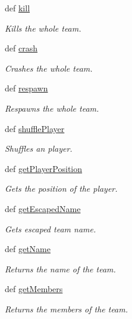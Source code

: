 \begin{DoxyCompactItemize}
def \hyperlink{class_team_1_1_team_a48d9c2e6877e5f8cead68457b4051727}{kill}
\begin{DoxyCompactList}\small\item\em \-Kills the whole team. \end{DoxyCompactList}\item 
def \hyperlink{class_team_1_1_team_a2e1276b87f9fe146e1aa2394c2b1be31}{crash}
\begin{DoxyCompactList}\small\item\em \-Crashes the whole team. \end{DoxyCompactList}\item 
def \hyperlink{class_team_1_1_team_ad5ff281b662ead58557ac814714f7a22}{respawn}
\begin{DoxyCompactList}\small\item\em \-Respawns the whole team. \end{DoxyCompactList}\item 
def \hyperlink{class_team_1_1_team_ae365a0bf8f225eae8e22d4d88492f77d}{shuffle\-Player}
\begin{DoxyCompactList}\small\item\em \-Shuffles an player. \end{DoxyCompactList}\item 
def \hyperlink{class_team_1_1_team_a369d8281563585eb4aed97e3cfd91ca6}{get\-Player\-Position}
\begin{DoxyCompactList}\small\item\em \-Gets the position of the player. \end{DoxyCompactList}\item 
def \hyperlink{class_team_1_1_team_a5f0957b6e1a6c1f72ab5314f2e3c421f}{get\-Escaped\-Name}
\begin{DoxyCompactList}\small\item\em \-Gets escaped team name. \end{DoxyCompactList}\item 
def \hyperlink{class_team_1_1_team_abe702f055d3373a92e17fe09ec734454}{get\-Name}
\begin{DoxyCompactList}\small\item\em \-Returns the name of the team. \end{DoxyCompactList}\item 
def \hyperlink{class_team_1_1_team_ab608f12c175516d7b0a76b3a0a14a69e}{get\-Members}
\begin{DoxyCompactList}\small\item\em \-Returns the members of the team. \end{DoxyCompactList}\end{DoxyCompactItemize}
